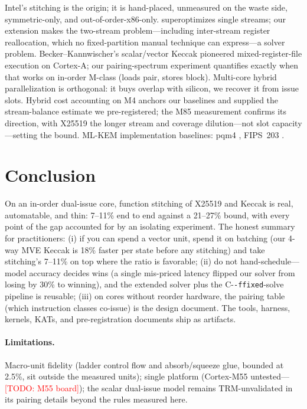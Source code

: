 \documentclass[11pt,a4paper]{article}
\newcommand{\todo}[1]{\textcolor{red}{[TODO: #1]}}
\begin{document}
Intel's stitching \cite{Intel10} is the origin; it is hand-placed, unmeasured
on the waste side, symmetric-only, and out-of-order-x86-only.
\slothy{} \cite{Slothy22,SlothyM7_25} superoptimizes single streams; our
extension makes the two-stream problem---including inter-stream register
reallocation, which no fixed-partition manual technique can express---a solver
problem. Becker--Kannwischer's scalar/vector Keccak \cite{BK22} pioneered
mixed-register-file execution on Cortex-A; our pairing-spectrum experiment
quantifies exactly when that works on in-order M-class (loads pair, stores
block). Multi-core hybrid parallelization \cite{DualCore25,ParHyb26} is
orthogonal: it buys overlap with silicon, we recover it from issue slots.
Hybrid cost accounting on M4 \cite{Sim26} anchors our baselines and supplied the
stream-balance estimate we pre-registered; the M85 measurement confirms its
direction, with X25519 the longer stream and coverage dilution---not slot
capacity---setting the bound. ML-KEM implementation baselines: pqm4 \cite{pqm4},
FIPS~203 \cite{FIPS203}.

\section{Conclusion}\label{sec:conclusion}

On an in-order dual-issue core, function stitching of X25519 and Keccak is
real, automatable, and thin: 7--11\% end to end against a 21--27\% bound, with
every point of the gap accounted for by an isolating experiment. The honest
summary for practitioners: (i) if you can spend a vector unit, spend it on
batching (our 4-way MVE Keccak is 18\% faster per state before any stitching)
and take stitching's 7--11\% on top where the ratio is favorable; (ii) do not
hand-schedule---model accuracy decides wins (a single mis-priced latency
flipped our solver from losing by 30\% to winning), and the extended solver
plus the C-\texttt{-ffixed}-solve pipeline is reusable; (iii) on cores without
reorder hardware, the pairing table (which instruction classes co-issue) is the
design document. The tools, harness, kernels, KATs, and pre-registration
documents ship as artifacts.

\paragraph{Limitations.} Macro-unit fidelity (ladder control flow and
absorb/squeeze glue, bounded at 2.5\%, sit outside the measured units); single
platform (Cortex-M55 untested---\todo{M55 board}); the scalar dual-issue model
remains TRM-unvalidated in its pairing details beyond the rules measured here.
\end{document}
